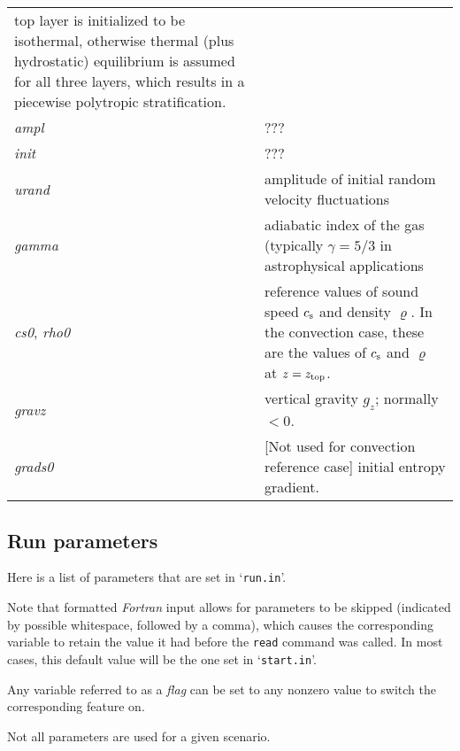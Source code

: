 \documentclass[12pt,twoside,notitlepage,a4paper]{article}
\newcommand{\code}[1]{\texttt{#1}}
\newcommand{\var}[1]{\textsl{#1}\index{#1}\/}
\newcommand{\file}[1]{`\texttt{#1}'}
\newcommand{\command}[1]{\code{#1}\index{#1}}
\newcommand{\cmd}[1]{\command{#1}}
\newcommand{\dfn}[1]{\textsl{#1}\index{#1}\/}
\newcommand{\name}[1]{\textsl{#1}\index{#1}\/}
\newcommand{\cs}            {c_{\rm s}}
\begin{document}
\begin{longtable}{lp{}}
                 top layer is initialized to be isothermal, otherwise
                 thermal (plus hydrostatic) equilibrium is assumed for all
                 three layers, which results in a piecewise polytropic
                 stratification. \\
  \var{ampl}   & ??? \\
  \var{init}   & ??? \\
  \var{urand}  & amplitude of initial random velocity fluctuations \\
  \var{gamma}  & adiabatic index of the gas (typically $\gamma=5/3$ in
                 astrophysical applications \\
  \var{cs0}, \var{rho0}
               & reference values of sound speed $\cs$ and density
                 $\varrho$. In the convection case, these are the values of
                 $\cs$ and $\varrho$ at $z=z_{\rm top}$. \\
  \var{gravz}  & vertical gravity $g_z$; normally $<0$. \\
  \var{grads0} & [Not used for convection reference case] initial entropy
                 gradient. \\
\bottomrule
\end{longtable}

\subsection{Run parameters}
\label{Run-params}

Here is a list of parameters that are set in \file{run.in}.

Note that formatted \name{Fortran} input allows for parameters to be
skipped (indicated by possible whitespace, followed by a comma), which
causes the corresponding variable to retain the value it had before the
\cmd{read} command was called.
In most cases, this default value will be the one set in \file{start.in}.

Any variable referred to as a \dfn{flag} can be set to any nonzero value
to switch the corresponding feature on.

Not all parameters are used for a given scenario.
\end{document}
